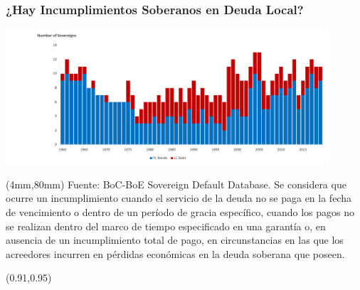 \documentclass[12pt, aspectratio=169, xcolor=dvipsnames]{beamer}
\begin{document}
\begin{frame}[label=SovereignDefaults]
	\frametitle{¿Hay Incumplimientos Soberanos en Deuda Local?}
	\begin{center}
		\includegraphics[trim={2.5cm 0cm 0.1cm 0.1cm},clip,width=0.9\textwidth,height=0.72\textheight]{../Figures/Slides/Defaults_FC_LC.png}
	\end{center}
	\begin{textblock*}{15cm}(4mm,80mm)
		\tiny Fuente: BoC-BoE Sovereign Default Database. Se considera que ocurre un incumplimiento cuando el servicio de la deuda no se paga en la fecha de vencimiento o dentro de un período de gracia específico, cuando los pagos no se realizan dentro del marco de tiempo especificado en una garantía o, en ausencia de un incumplimiento total de pago, en circunstancias en las que los acreedores incurren en pérdidas económicas en la deuda soberana que poseen.
	\end{textblock*}
	\begin{textblock*}{5cm}(0.91\textwidth,0.95\textheight)
		\hyperlink{CreditRating}{}
	\end{textblock*}
\end{frame}
\end{document}
